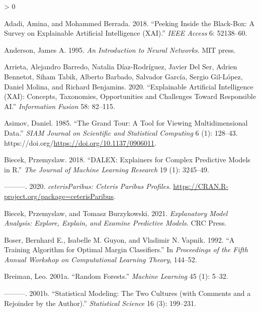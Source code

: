 \documentclass[
]{article}
\newlength{\cslhangindent}
\newenvironment{CSLReferences}[2] %
 {%
  \setlength{\parindent}{0pt}
  \ifodd #1 \everypar{\setlength{\hangindent}{\cslhangindent}}\ignorespaces\fi
  \ifnum #2 > 0
  \setlength{\parskip}{#2\baselineskip}
  \fi
 }%
 {}
\begin{document}
\hypertarget{refs}{}
\begin{CSLReferences}{1}{0}
\leavevmode\hypertarget{ref-adadi_peeking_2018}{}%
Adadi, Amina, and Mohammed Berrada. 2018. {``Peeking Inside the
Black-Box: A Survey on Explainable Artificial Intelligence ({XAI}).''}
\emph{IEEE Access} 6: 52138--60.

\leavevmode\hypertarget{ref-anderson_introduction_1995}{}%
Anderson, James A. 1995. \emph{An Introduction to Neural Networks}. MIT
press.

\leavevmode\hypertarget{ref-arrieta_explainable_2020}{}%
Arrieta, Alejandro Barredo, Natalia Díaz-Rodríguez, Javier Del Ser,
Adrien Bennetot, Siham Tabik, Alberto Barbado, Salvador García, Sergio
Gil-López, Daniel Molina, and Richard Benjamins. 2020. {``Explainable
{Artificial} {Intelligence} ({XAI}): {Concepts}, Taxonomies,
Opportunities and Challenges Toward Responsible {AI}.''}
\emph{Information Fusion} 58: 82--115.

\leavevmode\hypertarget{ref-asimov_grand_1985}{}%
Asimov, Daniel. 1985. {``The {Grand} {Tour}: A {Tool} for {Viewing}
{Multidimensional} {Data}.''} \emph{SIAM Journal on Scientific and
Statistical Computing} 6 (1): 128--43.
https://doi.org/\url{https://doi.org/10.1137/0906011}.

\leavevmode\hypertarget{ref-biecek_dalex_2018}{}%
Biecek, Przemyslaw. 2018. {``{DALEX}: Explainers for Complex Predictive
Models in {R}.''} \emph{The Journal of Machine Learning Research} 19
(1): 3245--49.

\leavevmode\hypertarget{ref-biecek_ceterisparibus_2020}{}%
---------. 2020. \emph{{ceterisParibus}: {Ceteris} {Paribus}
{Profiles}}. \url{https://CRAN.R-project.org/package=ceterisParibus}.

\leavevmode\hypertarget{ref-biecek_explanatory_2021}{}%
Biecek, Przemyslaw, and Tomasz Burzykowski. 2021. \emph{Explanatory
{Model} {Analysis}: {Explore}, {Explain}, and {Examine} {Predictive}
{Models}}. CRC Press.

\leavevmode\hypertarget{ref-boser_training_1992}{}%
Boser, Bernhard E., Isabelle M. Guyon, and Vladimir N. Vapnik. 1992.
{``A Training Algorithm for Optimal Margin Classifiers.''} In
\emph{Proceedings of the Fifth Annual Workshop on {Computational}
Learning Theory}, 144--52.

\leavevmode\hypertarget{ref-breiman_random_2001}{}%
Breiman, Leo. 2001a. {``Random Forests.''} \emph{Machine Learning} 45
(1): 5--32.

\leavevmode\hypertarget{ref-breiman_statistical_2001}{}%
---------. 2001b. {``Statistical Modeling: {The} Two Cultures (with
Comments and a Rejoinder by the Author).''} \emph{Statistical Science}
16 (3): 199--231.


\end{CSLReferences}
\end{document}
